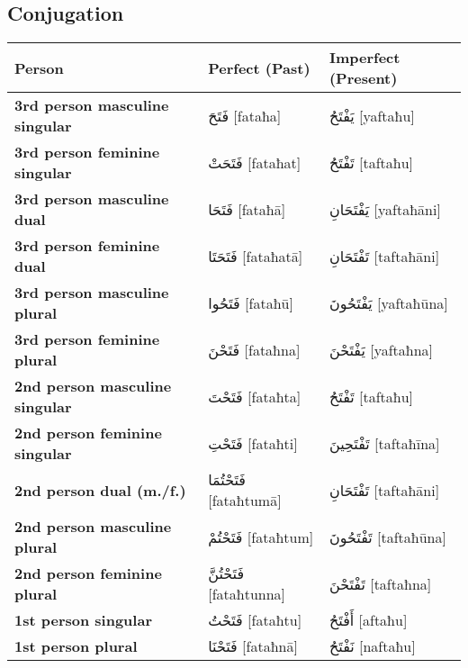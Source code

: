 \documentclass[letter,12pt]{article}
\begin{document}
\subsection{Conjugation}
\begin{longtable}{|>{\raggedright}p{3.5cm}|p{5cm}|p{5cm}|}
\hline
\textbf{Person} & \textbf{Perfect (Past)} & \textbf{Imperfect (Present)} \\
\hline
\textbf{3rd person masculine singular} & \textarabic{فَتَحَ} [fataħa] & \textarabic{يَفْتَحُ} [yaftaħu] \\
\hline
\textbf{3rd person feminine singular} & \textarabic{فَتَحَتْ} [fataħat] & \textarabic{تَفْتَحُ} [taftaħu] \\
\hline
\textbf{3rd person masculine dual} & \textarabic{فَتَحَا} [fataħā] & \textarabic{يَفْتَحَانِ} [yaftaħāni] \\
\hline
\textbf{3rd person feminine dual} & \textarabic{فَتَحَتَا} [fataħatā] & \textarabic{تَفْتَحَانِ} [taftaħāni] \\
\hline
\textbf{3rd person masculine plural} & \textarabic{فَتَحُوا} [fataħū] & \textarabic{يَفْتَحُونَ} [yaftaħūna] \\
\hline
\textbf{3rd person feminine plural} & \textarabic{فَتَحْنَ} [fataħna] & \textarabic{يَفْتَحْنَ} [yaftaħna] \\
\hline
\textbf{2nd person masculine singular} & \textarabic{فَتَحْتَ} [fataħta] & \textarabic{تَفْتَحُ} [taftaħu] \\
\hline
\textbf{2nd person feminine singular} & \textarabic{فَتَحْتِ} [fataħti] & \textarabic{تَفْتَحِينَ} [taftaħīna] \\
\hline
\textbf{2nd person dual (m./f.)} & \textarabic{فَتَحْتُمَا} [fataħtumā] & \textarabic{تَفْتَحَانِ} [taftaħāni] \\
\hline
\textbf{2nd person masculine plural} & \textarabic{فَتَحْتُمْ} [fataħtum] & \textarabic{تَفْتَحُونَ} [taftaħūna] \\
\hline
\textbf{2nd person feminine plural} & \textarabic{فَتَحْتُنَّ} [fataħtunna] & \textarabic{تَفْتَحْنَ} [taftaħna] \\
\hline
\textbf{1st person singular} & \textarabic{فَتَحْتُ} [fataħtu] & \textarabic{أَفْتَحُ} [aftaħu] \\
\hline
\textbf{1st person plural} & \textarabic{فَتَحْنَا} [fataħnā] & \textarabic{نَفْتَحُ} [naftaħu] \\
\hline
\end{longtable}
\end{document}
